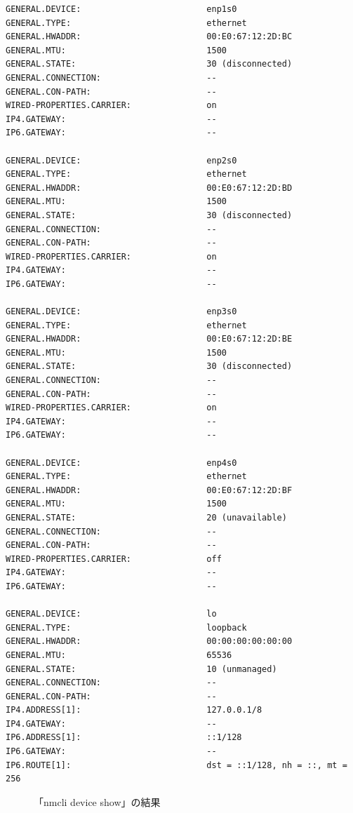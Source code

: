 \documentclass{ltjsarticle} %
\begin{document}
\begin{mdframed}
  \begin{verbatim}
GENERAL.DEVICE:                         enp1s0
GENERAL.TYPE:                           ethernet
GENERAL.HWADDR:                         00:E0:67:12:2D:BC
GENERAL.MTU:                            1500
GENERAL.STATE:                          30 (disconnected)
GENERAL.CONNECTION:                     --
GENERAL.CON-PATH:                       --
WIRED-PROPERTIES.CARRIER:               on
IP4.GATEWAY:                            --
IP6.GATEWAY:                            --

GENERAL.DEVICE:                         enp2s0
GENERAL.TYPE:                           ethernet
GENERAL.HWADDR:                         00:E0:67:12:2D:BD
GENERAL.MTU:                            1500
GENERAL.STATE:                          30 (disconnected)
GENERAL.CONNECTION:                     --
GENERAL.CON-PATH:                       --
WIRED-PROPERTIES.CARRIER:               on
IP4.GATEWAY:                            --
IP6.GATEWAY:                            --

GENERAL.DEVICE:                         enp3s0
GENERAL.TYPE:                           ethernet
GENERAL.HWADDR:                         00:E0:67:12:2D:BE
GENERAL.MTU:                            1500
GENERAL.STATE:                          30 (disconnected)
GENERAL.CONNECTION:                     --
GENERAL.CON-PATH:                       --
WIRED-PROPERTIES.CARRIER:               on
IP4.GATEWAY:                            --
IP6.GATEWAY:                            --

GENERAL.DEVICE:                         enp4s0
GENERAL.TYPE:                           ethernet
GENERAL.HWADDR:                         00:E0:67:12:2D:BF
GENERAL.MTU:                            1500
GENERAL.STATE:                          20 (unavailable)
GENERAL.CONNECTION:                     --
GENERAL.CON-PATH:                       --
WIRED-PROPERTIES.CARRIER:               off
IP4.GATEWAY:                            --
IP6.GATEWAY:                            --

GENERAL.DEVICE:                         lo
GENERAL.TYPE:                           loopback
GENERAL.HWADDR:                         00:00:00:00:00:00
GENERAL.MTU:                            65536
GENERAL.STATE:                          10 (unmanaged)
GENERAL.CONNECTION:                     --
GENERAL.CON-PATH:                       --
IP4.ADDRESS[1]:                         127.0.0.1/8
IP4.GATEWAY:                            --
IP6.ADDRESS[1]:                         ::1/128
IP6.GATEWAY:                            --
IP6.ROUTE[1]:                           dst = ::1/128, nh = ::, mt = 256
  \end{verbatim}
  \end{mdframed}
  \begin{figure}[H]
  \caption{「nmcli device show」の結果}
  \label{fig:show}
\end{figure}
\end{document}
